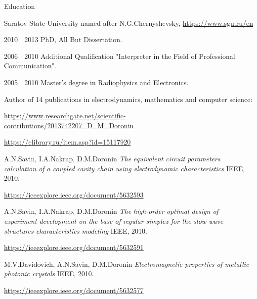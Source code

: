 \documentclass{resume}
\begin{document}

\begin{rSection}{Education}

\begin{rSubsection}{Saratov State University named after N.G.Chernyshevsky, \url{https://www.sgu.ru/en}}{}{}{}

      2010 | 2013 PhD, All But Dissertation.

      2006 | 2010 Additional Qualification "Interpreter in the Field of Professional Communication".

      2005 | 2010 Master's degree in Radiophysics and Electronics.


      Author of 14 publications in electrodynamics, mathematics and computer science:
      \item[] \url{https://www.researchgate.net/scientific-contributions/2013742207_D_M_Doronin}
      \item[] \url{https://elibrary.ru/item.asp?id=15117920}

\bigskip
\renewcommand{\section}[2]{\textbf{SELECTED PUBLICATIONS}}
\begin{thebibliography}{}

    \bibitem{} 
    A.N.Savin, I.A.Nakrap, D.M.Doronin
    \textit{The equivalent circuit parameters calculation of a coupled cavity chain using electrodynamic characteristics}
    IEEE, 2010.

    \url{https://ieeexplore.ieee.org/document/5632593}

    \bibitem{} 
    A.N.Savin, I.A.Nakrap, D.M.Doronin
    \textit{The high-order optimal design of experiment development on the base of regular simplex for the slow-wave structures characteristics modeling}
    IEEE, 2010.

    \url{https://ieeexplore.ieee.org/document/5632591}


    M.V.Davidovich, A.N.Savin, D.M.Doronin
    \textit{Electromagnetic properties of metallic photonic crystals}
    IEEE, 2010.

    \url{https://ieeexplore.ieee.org/document/5632577}
\end{thebibliography}

\end{rSubsection}
\end{rSection}
\end{document}

